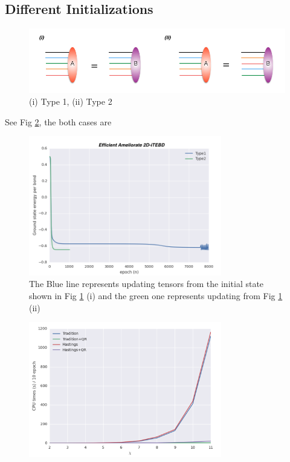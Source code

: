 \subsection{Different Initializations}

\begin{figure}[ht]
	\centering
	\includegraphics[width=1.00\textwidth]{figures/fig322.png}
	\caption[Different methods to initialize the states]{(i) Type 1, (ii) Type 2}
	\label{fig322}
\end{figure}

See Fig \ref{fig323}, the both cases are 

\begin{figure}[ht]
	\centering
	\includegraphics[width=0.75\textwidth]{figures/fig323.png}
	\caption[Comparison the results of Heisenberg model on square lattice which are obtaining from different initial states.]{The Blue line represents updating tensors from the initial state shown in Fig \ref{fig322} (i) and the green one represents updating from Fig \ref{fig322} (ii)}
	\label{fig323}
\end{figure}

\begin{figure}[ht]
	\centering
	\includegraphics[width=0.75\textwidth]{figures/fig324.png}
	\caption[tmp]{}
	\label{fig324}
\end{figure}

